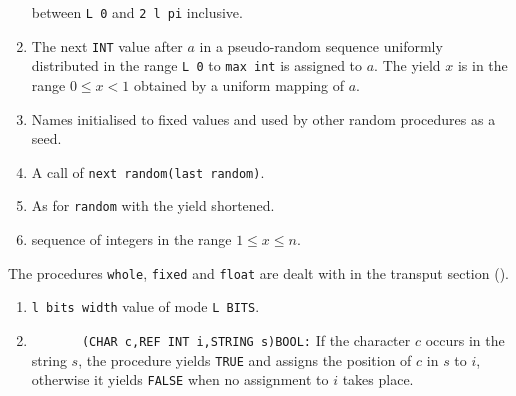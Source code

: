 \begin{enumerate}
between \verb|L 0| and \verb|2 l pi| inclusive.
\item {} \newline
The next \verb|INT| value after $a$ in a pseudo-random sequence
uniformly distributed in the range \verb|L 0| to \verb|max int| is
assigned to $a$. The yield $x$ is in the range $0\leq x<1$ obtained by
a uniform mapping of $a$.
\item {} \newline
{} \newline
Names initialised to fixed values and used by other random procedures
as a seed.
\item {} \newline
A call of \verb|next random(last random)|.
\item {}\newline
As for \verb|random| with the yield shortened.
\item {}\newline
{} 
 sequence of
integers in the range $1\leq x\leq n$.
\end{enumerate}

The procedures \verb|whole|, \verb|fixed| and \verb|float| are
dealt with in the transput section ().
\begin{enumerate}
\item {}\newline
{} \verb|l bits width|
 
 value of mode \verb|L BITS|.
\item {}\newline
      \verb|       (CHAR c,REF INT i,STRING s)BOOL:|\newline
If the character $c$ occurs in the string $s$, the procedure yields
\verb|TRUE| and assigns the position of $c$ in $s$ to $i$, otherwise it
yields \verb|FALSE| when no assignment to $i$ takes place.
\end{enumerate}

